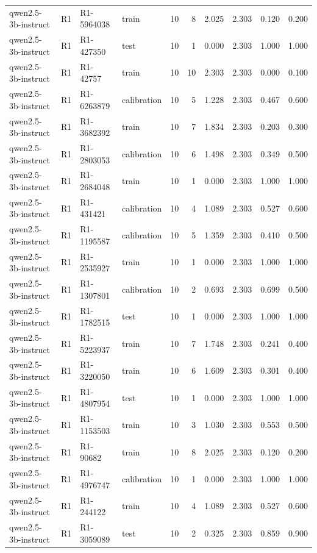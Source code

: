 \begin{table}
\begin{tabular}{llllrrrrrr}
qwen2.5-3b-instruct & R1 & R1-5964038 & train & 10 & 8 & 2.025 & 2.303 & 0.120 & 0.200 \\
qwen2.5-3b-instruct & R1 & R1-427350 & test & 10 & 1 & 0.000 & 2.303 & 1.000 & 1.000 \\
qwen2.5-3b-instruct & R1 & R1-42757 & train & 10 & 10 & 2.303 & 2.303 & 0.000 & 0.100 \\
qwen2.5-3b-instruct & R1 & R1-6263879 & calibration & 10 & 5 & 1.228 & 2.303 & 0.467 & 0.600 \\
qwen2.5-3b-instruct & R1 & R1-3682392 & train & 10 & 7 & 1.834 & 2.303 & 0.203 & 0.300 \\
qwen2.5-3b-instruct & R1 & R1-2803053 & calibration & 10 & 6 & 1.498 & 2.303 & 0.349 & 0.500 \\
qwen2.5-3b-instruct & R1 & R1-2684048 & train & 10 & 1 & 0.000 & 2.303 & 1.000 & 1.000 \\
qwen2.5-3b-instruct & R1 & R1-431421 & calibration & 10 & 4 & 1.089 & 2.303 & 0.527 & 0.600 \\
qwen2.5-3b-instruct & R1 & R1-1195587 & calibration & 10 & 5 & 1.359 & 2.303 & 0.410 & 0.500 \\
qwen2.5-3b-instruct & R1 & R1-2535927 & train & 10 & 1 & 0.000 & 2.303 & 1.000 & 1.000 \\
qwen2.5-3b-instruct & R1 & R1-1307801 & calibration & 10 & 2 & 0.693 & 2.303 & 0.699 & 0.500 \\
qwen2.5-3b-instruct & R1 & R1-1782515 & test & 10 & 1 & 0.000 & 2.303 & 1.000 & 1.000 \\
qwen2.5-3b-instruct & R1 & R1-5223937 & train & 10 & 7 & 1.748 & 2.303 & 0.241 & 0.400 \\
qwen2.5-3b-instruct & R1 & R1-3220050 & train & 10 & 6 & 1.609 & 2.303 & 0.301 & 0.400 \\
qwen2.5-3b-instruct & R1 & R1-4807954 & test & 10 & 1 & 0.000 & 2.303 & 1.000 & 1.000 \\
qwen2.5-3b-instruct & R1 & R1-1153503 & train & 10 & 3 & 1.030 & 2.303 & 0.553 & 0.500 \\
qwen2.5-3b-instruct & R1 & R1-90682 & train & 10 & 8 & 2.025 & 2.303 & 0.120 & 0.200 \\
qwen2.5-3b-instruct & R1 & R1-4976747 & calibration & 10 & 1 & 0.000 & 2.303 & 1.000 & 1.000 \\
qwen2.5-3b-instruct & R1 & R1-244122 & train & 10 & 4 & 1.089 & 2.303 & 0.527 & 0.600 \\
qwen2.5-3b-instruct & R1 & R1-3059089 & test & 10 & 2 & 0.325 & 2.303 & 0.859 & 0.900 \\

\end{tabular}
\end{table}
